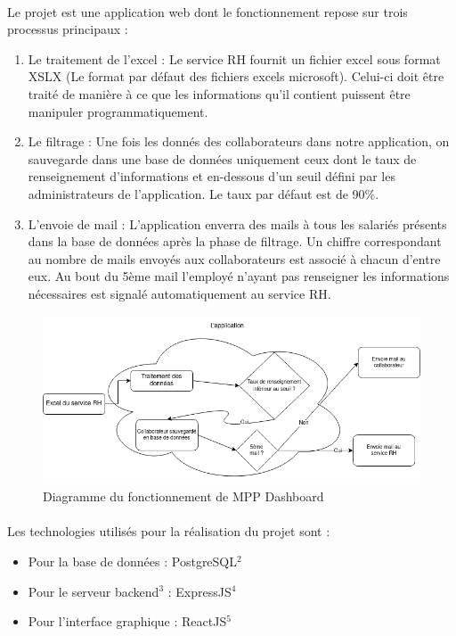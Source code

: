 \documentclass[12pt]{article}
\begin{document}
\begin {sloppypar}
\paragraph {} 
Le projet est une application web dont le fonctionnement repose sur trois processus
principaux : 
\begin {enumerate}
  \item 
    Le traitement de l'excel : Le service RH fournit un fichier excel sous format XSLX 
    (Le format par défaut des fichiers excels microsoft). Celui-ci doit être traité de 
    manière à ce que les informations qu'il contient puissent être manipuler 
    programmatiquement.
  \item 
    Le filtrage : Une fois les donnés des collaborateurs dans notre application, on
    sauvegarde dans une base de données uniquement ceux dont le taux de renseignement 
    d'informations et en-dessous d'un seuil défini par les administrateurs de 
    l'application. Le taux par défaut est de 90\%. 
  \item 
    L'envoie de mail : L'application enverra des mails à tous les salariés présents 
    dans la base de données après la phase de filtrage. Un chiffre correspondant au nombre
    de mails envoyés aux collaborateurs est associé à chacun d'entre eux. Au bout du 
    5ème mail l'employé n'ayant pas renseigner les informations nécessaires est signalé 
    automatiquement au service RH.
\end{enumerate}
\newpage
\begin{figure}
  \includegraphics[width=\textwidth] {mpp-diagram.png}
  \caption {Diagramme du fonctionnement de MPP Dashboard}
\end{figure}
\paragraph {}
Les technologies utilisés pour la réalisation du projet sont : 
\begin {itemize}
\item   
  Pour la base de données : PostgreSQL$^{2}$ 
\item 
  Pour le serveur backend$^{3}$ : ExpressJS$^{4}$
\item 
  Pour l'interface graphique : ReactJS$^{5}$
\end {itemize}


\end{sloppypar}
\end{document}
